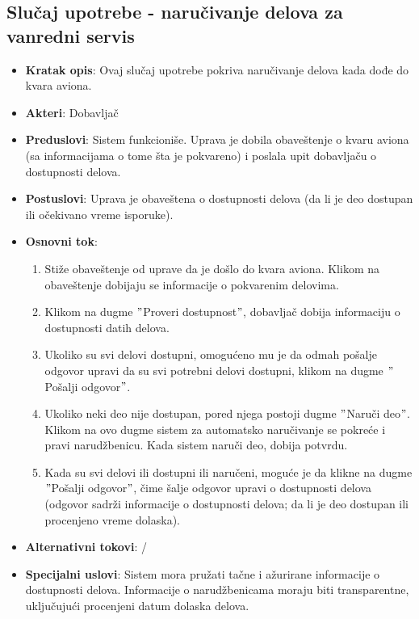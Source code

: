 \documentclass[a4paper]{article}
\begin{document}
\subsection{Slučaj upotrebe - naručivanje delova za vanredni servis}
\label{subsec:narucivanje_vanredan_servis}
\begin{itemize}
    \item \textbf{Kratak opis}: Ovaj slučaj upotrebe pokriva naručivanje delova kada dođe do kvara aviona.
    \item \textbf{Akteri}: Dobavljač
    \item \textbf{Preduslovi}: Sistem funkcioniše. Uprava je dobila obaveštenje o kvaru aviona (sa informacijama o tome šta je pokvareno) i poslala upit dobavljaču o dostupnosti delova.
    \item \textbf{Postuslovi}: Uprava je obaveštena o dostupnosti delova (da li je deo dostupan ili očekivano vreme isporuke).
    \item \textbf{Osnovni tok}: 
        \begin{enumerate}
            \item Stiže obaveštenje od uprave da je došlo do kvara aviona. Klikom na obaveštenje dobijaju se informacije o pokvarenim delovima.
            \item Klikom na dugme $"$Proveri dostupnost$"$, dobavljač dobija informaciju o dostupnosti datih delova.
            \item Ukoliko su svi delovi dostupni, omogućeno mu je da odmah pošalje odgovor upravi da su svi potrebni delovi dostupni, klikom na dugme $"$Pošalji odgovor$"$.
            \item Ukoliko neki deo nije dostupan, pored njega postoji dugme $"$Naruči deo$"$. Klikom na ovo dugme sistem za automatsko naručivanje se pokreće i pravi narudžbenicu. Kada sistem naruči deo, dobija potvrdu.
            \item Kada su svi delovi ili dostupni ili naručeni, moguće je da klikne na dugme $"$Pošalji odgovor$"$, čime šalje odgovor upravi o dostupnosti delova (odgovor sadrži informacije o dostupnosti delova; da li je deo dostupan ili procenjeno vreme dolaska).
        \end{enumerate}
    \item \textbf{Alternativni tokovi}: /
    \item \textbf{Specijalni uslovi}: Sistem mora pružati tačne i ažurirane informacije o dostupnosti delova. Informacije o narudžbenicama moraju biti transparentne, uključujući procenjeni datum dolaska delova.
\end{itemize}
\end{document}
